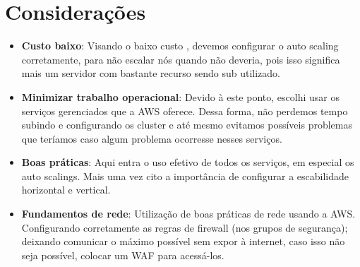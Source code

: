 \documentclass{article}
\begin{document}
    \section{Considerações}
        \begin{itemize}
            \item \textbf{Custo baixo}: Visando o baixo custo , devemos configurar o auto scaling corretamente, para não escalar nós quando não deveria, pois isso significa mais um servidor com bastante recurso sendo sub utilizado.
            \item \textbf{Minimizar trabalho operacional}: Devido à este ponto, escolhi usar os serviços gerenciados que a AWS oferece. Dessa forma, não perdemos tempo subindo e configurando os cluster e até mesmo evitamos possíveis problemas que teríamos caso algum problema ocorresse nesses serviços.
            \item \textbf{Boas práticas}: Aqui entra o uso efetivo de todos os serviços, em especial os auto scalings. Mais uma vez cito a importância de configurar a escabilidade horizontal e vertical.
            \item \textbf{Fundamentos de rede}: Utilização de boas práticas de rede usando a AWS. Configurando corretamente as regras de firewall (nos grupos de segurança); deixando comunicar o máximo possível sem expor à internet, caso isso não seja possível, colocar um WAF para acessá-los.
        \end{itemize}
\end{document}
